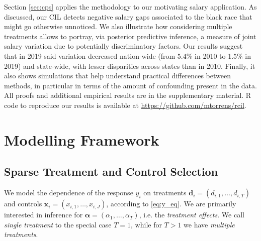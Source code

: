 \documentclass[12pt]{article}
\newcommand{\mb}[1]{\mathbf{#1}}
\newcommand{\balpha}{{\bm{\alpha}}}
\newcommand{\omcom}[1]{ {\color{blue} #1} }
\newcommand{\davidcom}[1]{{\color{red} [DR. #1]} }
\begin{document}
Section \ref{sec:cps} applies the methodology to our motivating salary application. As discussed, our CIL detects negative salary gaps associated to the black race that might go otherwise unnoticed. 
We also illustrate how considering multiple treatments allows to portray, via posterior predictive inference, a measure of joint salary variation due to potentially discriminatory factors. Our results suggest that in 2019 said variation decreased nation-wide (from 5.4\% in 2010 to 1.5\% in 2019) and state-wide, with lesser disparities across states than in 2010.
Finally, it also shows simulations that help understand practical differences between methods, in particular in terms of the amount of confounding present in the data.
All proofs and additional empirical results are in the supplementary material.
R code to reproduce our results is available at \url{https://github.com/mtorrens/rcil}.


\section{Modelling Framework} \label{sec:method}

\subsection{Sparse Treatment and Control Selection}
\label{sec:model}

We model the dependence of the response $y_{i}$ on treatments $\mb{d}_{i} = (d_{i,1}, \ldots, d_{i,T})$ and controls $\mb{x}_{i} = (x_{i,1}, \dots, x_{i,J})$, according to \eqref{eq:y_eq}. %
We are primarily interested in inference for $\balpha = (\alpha_{1}, \dots, \alpha_{T})$, i.e.  the \textit{treatment effects}. We call \textit{single treatment} to the special case $T=1$, while for $T>1$ we have  \textit{multiple treatments}.
\end{document}

